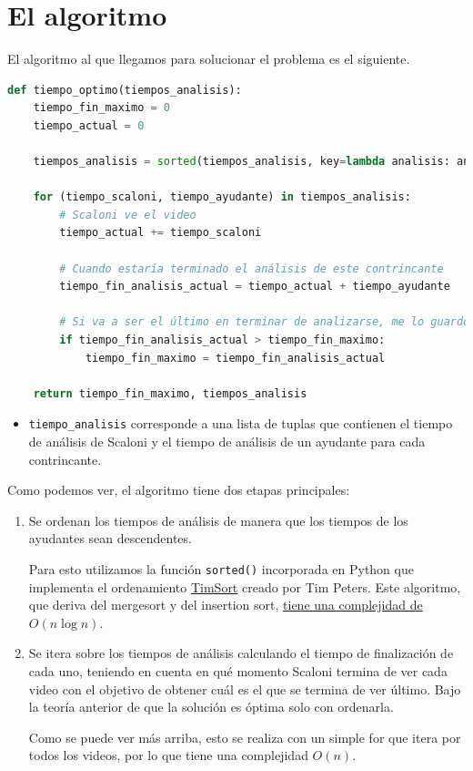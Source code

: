 \documentclass{estilo}
\begin{document}
\section{El algoritmo}

El algoritmo al que llegamos para solucionar el problema es el siguiente.

\begin{lstlisting}[language=Python]
def tiempo_optimo(tiempos_analisis):
    tiempo_fin_maximo = 0
    tiempo_actual = 0

    tiempos_analisis = sorted(tiempos_analisis, key=lambda analisis: analisis[1], reverse=True)

    for (tiempo_scaloni, tiempo_ayudante) in tiempos_analisis:
        # Scaloni ve el video
        tiempo_actual += tiempo_scaloni

        # Cuando estaría terminado el análisis de este contrincante
        tiempo_fin_analisis_actual = tiempo_actual + tiempo_ayudante

        # Si va a ser el último en terminar de analizarse, me lo guardo
        if tiempo_fin_analisis_actual > tiempo_fin_maximo:
            tiempo_fin_maximo = tiempo_fin_analisis_actual 

    return tiempo_fin_maximo, tiempos_analisis
\end{lstlisting}
\begin{itemize}
\item \texttt{tiempo\_analisis} corresponde a una lista de tuplas que contienen el tiempo de análisis de Scaloni y el tiempo de análisis de un ayudante para cada contrincante.
\end{itemize}

Como podemos ver, el algoritmo tiene dos etapas principales:
\begin{enumerate}
\item Se ordenan los tiempos de análisis de manera que los tiempos de los ayudantes sean descendentes.
    
    Para esto utilizamos la función \texttt{sorted()} incorporada en Python que implementa el ordenamiento \href{https://en.wikipedia.org/wiki/Timsort}{TimSort} creado por Tim Peters. Este algoritmo, que deriva del mergesort y del insertion sort, \href{https://drops.dagstuhl.de/opus/volltexte/2018/9467/pdf/LIPIcs-ESA-2018-4.pdf}{tiene una complejidad de} $O(n \log n)$.
\item Se itera sobre los tiempos de análisis calculando el tiempo de finalización de cada uno, teniendo en cuenta en qué momento Scaloni termina de ver cada video con el objetivo de obtener cuál es el que se termina de ver último. Bajo la teoría anterior de que la solución es óptima solo con ordenarla.
    
    Como se puede ver más arriba, esto se realiza con un simple for que itera por todos los videos, por lo que tiene una complejidad $O(n)$.
\end{enumerate}
\end{document}
